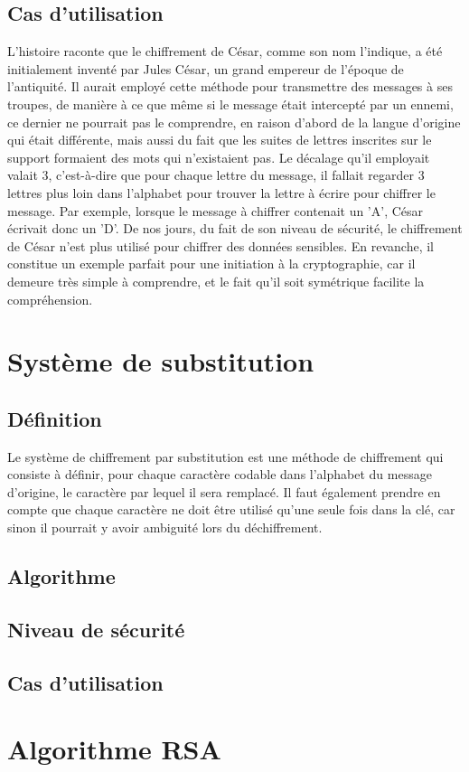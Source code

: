 		\subsection{Cas d'utilisation}
			L'histoire raconte que le chiffrement de César, comme son nom l'indique, a été initialement inventé par Jules César, un grand empereur de l'époque de l'antiquité. Il aurait employé cette méthode pour transmettre des messages à ses troupes, de manière à ce que même si le message était intercepté par un ennemi, ce dernier ne pourrait pas le comprendre, en raison d'abord de la langue d'origine qui était différente, mais aussi du fait que les suites de lettres inscrites sur le support formaient des mots qui n'existaient pas. Le décalage qu'il employait valait 3, c'est-à-dire que pour chaque lettre du message, il fallait regarder 3 lettres plus loin dans l'alphabet pour trouver la lettre à écrire pour chiffrer le message. Par exemple, lorsque le message à chiffrer contenait un 'A', César écrivait donc un 'D'.
			De nos jours, du fait de son niveau de sécurité, le chiffrement de César n'est plus utilisé pour chiffrer des données sensibles. En revanche, il constitue un exemple parfait pour une initiation à la cryptographie, car il demeure très simple à comprendre, et le fait qu'il soit symétrique facilite la compréhension.
	\section{Système de substitution}
		\subsection{Définition}
			Le système de chiffrement par substitution est une méthode de chiffrement qui consiste à définir, pour chaque caractère codable dans l'alphabet du message d'origine, le caractère par lequel il sera remplacé. Il faut également prendre en compte que chaque caractère ne doit être utilisé qu'une seule fois dans la clé, car sinon il pourrait y avoir ambiguité lors du déchiffrement. 
		\subsection{Algorithme}
		\subsection{Niveau de sécurité}
		\subsection{Cas d'utilisation}
	\section{Algorithme RSA}